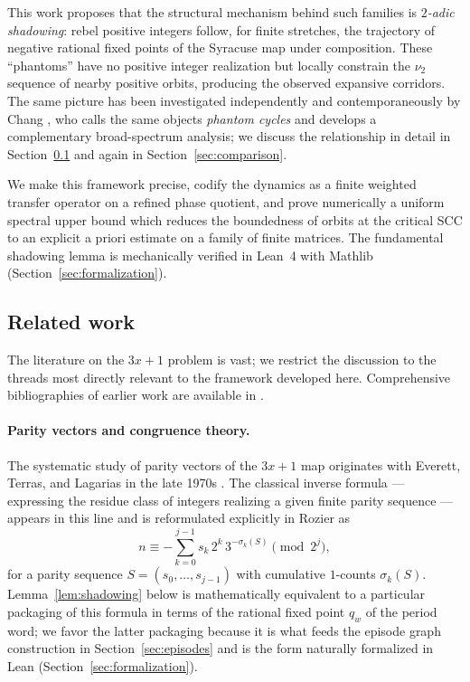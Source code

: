 \documentclass[11pt,a4paper]{article}
\theoremstyle{definition}
\begin{document}
This work proposes that the structural mechanism behind such families
is \emph{$2$-adic shadowing}: rebel positive integers follow, for
finite stretches, the trajectory of negative rational fixed points
of the Syracuse map under composition. These ``phantoms'' have no
positive integer realization but locally constrain the $\nu_2$
sequence of nearby positive orbits, producing the observed expansive
corridors. The same picture has been investigated independently and
contemporaneously by Chang \cite{chang2026}, who calls the same
objects \emph{phantom cycles} and develops a complementary
broad-spectrum analysis; we discuss the relationship in detail in
Section~\ref{sec:related} and again in
Section~\ref{sec:comparison}.

We make this framework precise, codify the dynamics as a finite
weighted transfer operator on a refined phase quotient, and prove
numerically a uniform spectral upper bound which reduces the
boundedness of orbits at the critical SCC to an explicit a priori
estimate on a family of finite matrices. The fundamental shadowing
lemma is mechanically verified in Lean~4 with Mathlib
(Section~\ref{sec:formalization}).

\subsection{Related work}
\label{sec:related}

The literature on the $3x+1$ problem is vast; we restrict the
discussion to the threads most directly relevant to the framework
developed here. Comprehensive bibliographies of earlier work are
available in \cite{lagarias2010,laga2003bib,laga2009bib}.

\paragraph{Parity vectors and congruence theory.}
The systematic study of parity vectors of the $3x+1$ map originates
with Everett, Terras, and Lagarias in the late 1970s
\cite{lagarias1985}. The classical inverse formula --- expressing
the residue class of integers realizing a given finite parity
sequence --- appears in this line and is reformulated explicitly
in Rozier \cite[Lemma 1]{rozier2025} as
\[
n \equiv -\sum_{k=0}^{j-1} s_k\, 2^k\, 3^{-\sigma_k(S)}
\pmod{2^j},
\]
for a parity sequence $S = (s_0, \dots, s_{j-1})$ with cumulative
$1$-counts $\sigma_k(S)$. Lemma~\ref{lem:shadowing} below is
mathematically equivalent to a particular packaging of this formula
in terms of the rational fixed point $q_w$ of the period word; we
favor the latter packaging because it is what feeds the episode
graph construction in Section~\ref{sec:episodes} and is the form
naturally formalized in Lean (Section~\ref{sec:formalization}).
\end{document}
